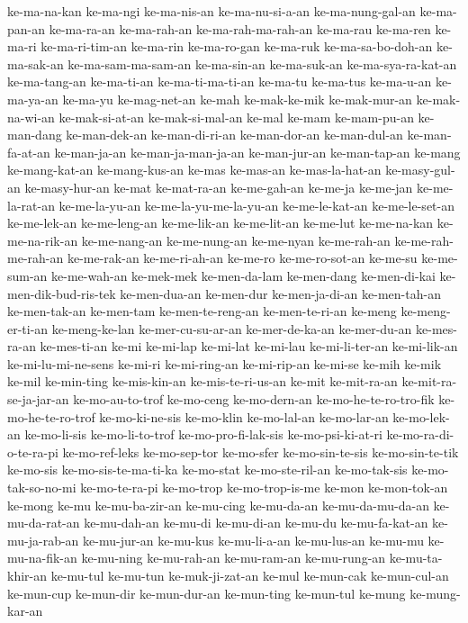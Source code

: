 {ke-ma-na-kan ke-ma-ngi ke-ma-nis-an ke-ma-nu-si-a-an ke-ma-nung-gal-an
ke-ma-pan-an ke-ma-ra-an ke-ma-rah-an ke-ma-rah-ma-rah-an ke-ma-rau
ke-ma-ren ke-ma-ri ke-ma-ri-tim-an ke-ma-rin ke-ma-ro-gan ke-ma-ruk
ke-ma-sa-bo-doh-an ke-ma-sak-an ke-ma-sam-ma-sam-an ke-ma-sin-an
ke-ma-suk-an ke-ma-sya-ra-kat-an ke-ma-tang-an ke-ma-ti-an
ke-ma-ti-ma-ti-an ke-ma-tu ke-ma-tus ke-ma-u-an ke-ma-ya-an ke-ma-yu
ke-mag-net-an ke-mah ke-mak-ke-mik ke-mak-mur-an ke-mak-na-wi-an
ke-mak-si-at-an ke-mak-si-mal-an ke-mal ke-mam ke-mam-pu-an ke-man-dang
ke-man-dek-an ke-man-di-ri-an ke-man-dor-an ke-man-dul-an ke-man-fa-at-an
ke-man-ja-an ke-man-ja-man-ja-an ke-man-jur-an ke-man-tap-an ke-mang
ke-mang-kat-an ke-mang-kus-an ke-mas ke-mas-an ke-mas-la-hat-an
ke-masy-gul-an ke-masy-hur-an ke-mat ke-mat-ra-an ke-me-gah-an ke-me-ja
ke-me-jan ke-me-la-rat-an ke-me-la-yu-an ke-me-la-yu-me-la-yu-an
ke-me-le-kat-an ke-me-le-set-an ke-me-lek-an ke-me-leng-an ke-me-lik-an
ke-me-lit-an ke-me-lut ke-me-na-kan ke-me-na-rik-an ke-me-nang-an
ke-me-nung-an ke-me-nyan ke-me-rah-an ke-me-rah-me-rah-an ke-me-rak-an
ke-me-ri-ah-an ke-me-ro ke-me-ro-sot-an ke-me-su ke-me-sum-an ke-me-wah-an
ke-mek-mek ke-men-da-lam ke-men-dang ke-men-di-kai ke-men-dik-bud-ris-tek
ke-men-dua-an ke-men-dur ke-men-ja-di-an ke-men-tah-an ke-men-tak-an
ke-men-tam ke-men-te-reng-an ke-men-te-ri-an ke-meng ke-meng-er-ti-an
ke-meng-ke-lan ke-mer-cu-su-ar-an ke-mer-de-ka-an ke-mer-du-an
ke-mes-ra-an ke-mes-ti-an ke-mi ke-mi-lap ke-mi-lat ke-mi-lau
ke-mi-li-ter-an ke-mi-lik-an ke-mi-lu-mi-ne-sens ke-mi-ri ke-mi-ring-an
ke-mi-rip-an ke-mi-se ke-mih ke-mik ke-mil ke-min-ting ke-mis-kin-an
ke-mis-te-ri-us-an ke-mit ke-mit-ra-an ke-mit-ra-se-ja-jar-an
ke-mo-au-to-trof ke-mo-ceng ke-mo-dern-an ke-mo-he-te-ro-tro-fik
ke-mo-he-te-ro-trof ke-mo-ki-ne-sis ke-mo-klin ke-mo-lal-an ke-mo-lar-an
ke-mo-lek-an ke-mo-li-sis ke-mo-li-to-trof ke-mo-pro-fi-lak-sis
ke-mo-psi-ki-at-ri ke-mo-ra-di-o-te-ra-pi ke-mo-ref-leks ke-mo-sep-tor
ke-mo-sfer ke-mo-sin-te-sis ke-mo-sin-te-tik ke-mo-sis
ke-mo-sis-te-ma-ti-ka ke-mo-stat ke-mo-ste-ril-an ke-mo-tak-sis
ke-mo-tak-so-no-mi ke-mo-te-ra-pi ke-mo-trop ke-mo-trop-is-me ke-mon
ke-mon-tok-an ke-mong ke-mu ke-mu-ba-zir-an ke-mu-cing ke-mu-da-an
ke-mu-da-mu-da-an ke-mu-da-rat-an ke-mu-dah-an ke-mu-di ke-mu-di-an
ke-mu-du ke-mu-fa-kat-an ke-mu-ja-rab-an ke-mu-jur-an ke-mu-kus
ke-mu-li-a-an ke-mu-lus-an ke-mu-mu ke-mu-na-fik-an ke-mu-ning
ke-mu-rah-an ke-mu-ram-an ke-mu-rung-an ke-mu-ta-khir-an ke-mu-tul
ke-mu-tun ke-muk-ji-zat-an ke-mul ke-mun-cak ke-mun-cul-an ke-mun-cup
ke-mun-dir ke-mun-dur-an ke-mun-ting ke-mun-tul ke-mung ke-mung-kar-an
}

